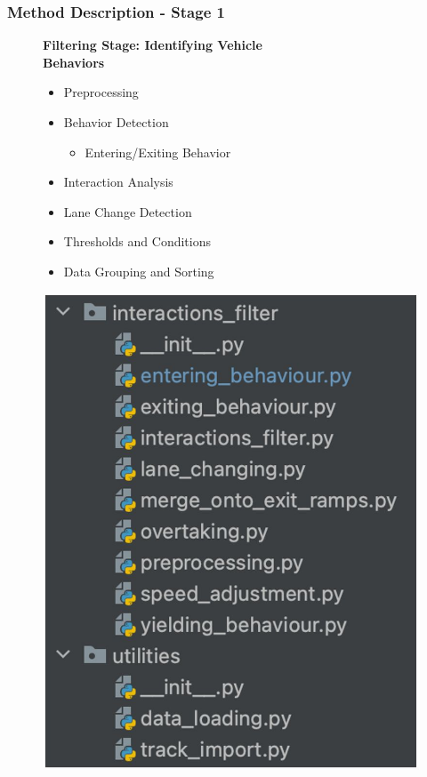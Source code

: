 \begin{frame}
  \frametitle{Method Description - Stage 1}

  \begin{figure}

    \begin{minipage}[b]{0.64\linewidth}
      \textbf{Filtering Stage: Identifying Vehicle \\ Behaviors}
      \begin{itemize}
          \item Preprocessing
          \item Behavior Detection
              \begin{itemize}
                  \item Entering/Exiting Behavior
              \end{itemize}
          \item Interaction Analysis
          \item Lane Change Detection
          \item Thresholds and Conditions
          \item Data Grouping and Sorting
      \end{itemize}
    \end{minipage}
    \begin{minipage}[b]{0.35\linewidth}

        \centering
        \includegraphics[width=1\textwidth]{figures/pictures_first_part/python_code_filter.jpeg}
    \end{minipage}
  \end{figure}
\end{frame}

